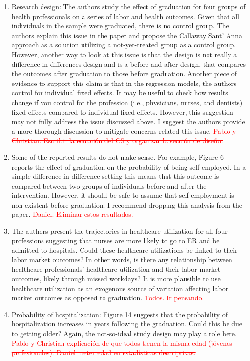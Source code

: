 \documentclass[12pt]{article}
\begin{document}
\begin{enumerate}
    \item Research design: The authors study the effect of graduation for four groups of health professionals on a series of labor and health outcomes. Given that all individuals in the sample were graduated, there is no control group. The authors explain this issue in the paper and propose the Callaway Sant' Anna approach as a solution utilizing a not-yet-treated group as a control group. However, another way to look at this issue is that the design is not really a difference-in-differences design and is a before-and-after design, that compares the outcomes after graduation to those before graduation. Another piece of evidence to support this claim is that in the regression models, the authors control for individual fixed effects. It may be useful to check how results change if you control for the profession (i.e., physicians, nurses, and dentists) fixed effects compared to individual fixed effects. However, this suggestion may not fully address the issue discussed above. I suggest the authors provide a more thorough discussion to mitigate concerns related this issue. \textcolor{red}{\st{Pablo y Christian. Escribir la ecuación del CS y organizar la sección de diseño.}}
    \item Some of the reported results do not make sense. For example, Figure 6 reports the effect of graduation on the probability of being self-employed. In a simple difference-in-difference setting this means that this outcome is compared between two groups of individuals before and after the intervention. However, it should be safe to assume that self-employment is non-existent before graduation. I recommend dropping this analysis from the paper. \textcolor{red}{\st{Daniel. Eliminar estos resultados.}}
    \item The authors present the trajectories in healthcare utilization for all four professions suggesting that nurses are more likely to go to ER and be admitted to hospitals. Could these healthcare utilizations be linked to their labor market outcomes? In other words, is there any relationship between healthcare professionals' healthcare utilization and their labor market outcomes, likely through missed workdays? It is more plausible to use healthcare utilization as an exogenous source of variation affecting labor market outcomes as opposed to graduation. \textcolor{red}{Todos. Ir pensando.}
    \item Probability of hospitalization: Figure 14 suggests that the probability of hospitalization increases in years following the graduation. Could this be due to getting older? Again, the not-so-ideal study design may play a role here. \textcolor{red}{\st{Pablo y Christian explicación de que todos tienen la misma edad (jóvenes profesionales). Daniel meter edad en estadísticas descriptivas.}}

\end{enumerate}
\end{document}
